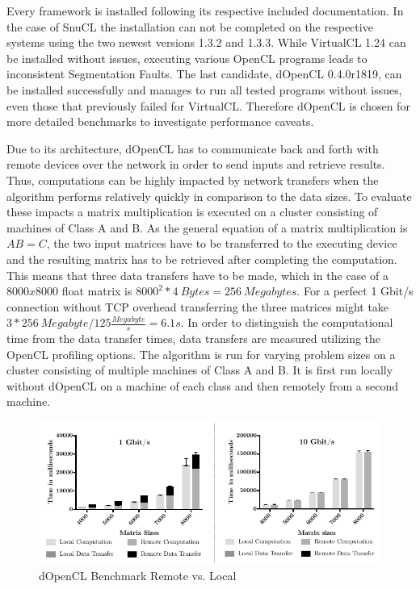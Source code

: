 Every framework is installed following its respective included documentation. In the case of SnuCL the installation can not be completed on the respective systems using the two newest versions 1.3.2 and 1.3.3. While VirtualCL 1.24 can be installed without issues, executing various OpenCL programs leads to inconsistent Segmentation Faults. The last candidate, dOpenCL 0.4.0r1819, can be installed successfully and manages to run all tested programs without issues, even those that previously failed for VirtualCL. Therefore dOpenCL is chosen for more detailed benchmarks to investigate performance caveats.

Due to its architecture, dOpenCL has to communicate back and forth with remote devices over the network in order to send inputs and retrieve results. Thus, computations can be highly impacted by network transfers when the algorithm performs relatively quickly in comparison to the data sizes. To evaluate these impacts a matrix multiplication is executed on a cluster consisting of machines of Class A and B. As the general equation of a matrix multiplication is $AB = C$, the two input matrices have to be transferred to the executing device and the resulting matrix has to be retrieved after completing the computation. This means that three data transfers have to be made, which in the case of a $8000x8000$ float matrix is $8000^2 * 4\ Bytes = 256\ Megabytes$. For a perfect 1 Gbit/s connection without TCP overhead transferring the three matrices might take $3*256\ Megabyte / 125\frac{Megabyte}{s} = 6.1s$. In order to distinguish the computational time from the data transfer times, data transfers are measured utilizing the OpenCL profiling options. The algorithm is run for varying problem sizes on a cluster consisting of multiple machines of Class A and B. It is first run locally without dOpenCL on a machine of each class and then remotely from a second machine.

\begin{figure}[H]

\includegraphics[width=1.0\textwidth]{images/data_transfer.pdf}
\centering
\caption{dOpenCL Benchmark Remote vs. Local}
\label{img:data_transfer}
\end{figure}

